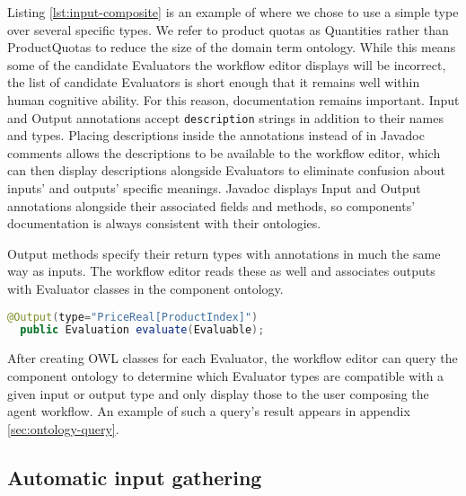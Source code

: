 \documentclass{article}
\begin{document}
Listing \ref{lst:input-composite} is an example of where we chose to use a simple type over several specific types.
We refer to product quotas as Quantities rather than ProductQuotas to reduce the size of the domain term ontology.
While this means some of the candidate Evaluators the workflow editor displays will be incorrect, the list of candidate Evaluators is short enough that it remains well within human cognitive ability.
For this reason, documentation remains important.
Input and Output annotations accept \texttt{description} strings in addition to their names and types.
Placing descriptions inside the annotations instead of in Javadoc comments allows the descriptions to be available to the workflow editor, which can then display descriptions alongside Evaluators to eliminate confusion about inputs' and outputs' specific meanings.
Javadoc displays Input and Output annotations alongside their associated fields and methods, so components' documentation is always consistent with their ontologies.

Output methods specify their return types with annotations in much the same way as inputs.
The workflow editor reads these as well and associates outputs with Evaluator classes in the component ontology.

{\small
\begin{lstlisting}[language={Java},frame={single},label={lst:output},caption={An Output annotation}]
  @Output(type="PriceReal[ProductIndex]")
  public Evaluation evaluate(Evaluable);
\end{lstlisting}
}

After creating OWL classes for each Evaluator, the workflow editor can query the component ontology to determine which Evaluator types are compatible with a given input or output type and only display those to the user composing the agent workflow.
An example of such a query's result appears in appendix \ref{sec:ontology-query}.

\subsection{Automatic input gathering}
\end{document}
